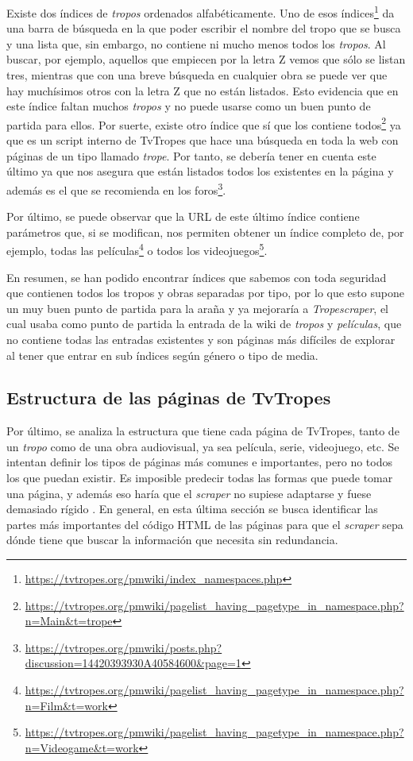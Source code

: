 Existe dos índices de \textit{tropos} ordenados alfabéticamente. Uno de esos
índices\footnote{\url{https://tvtropes.org/pmwiki/index_namespaces.php}} da una
barra de búsqueda en la que poder escribir el nombre del tropo que se busca y
una lista que, sin embargo, no contiene ni mucho menos todos los
\textit{tropos}. Al buscar, por ejemplo, aquellos que empiecen por la letra Z
vemos que sólo se listan tres, mientras que con una breve búsqueda en cualquier
obra se puede ver que hay muchísimos otros con la letra Z que no están listados.
Esto evidencia que en este índice faltan muchos \textit{tropos} y no puede
usarse como un buen punto de partida para ellos. Por suerte, existe otro índice
que sí que los contiene
todos\footnote{\url{https://tvtropes.org/pmwiki/pagelist_having_pagetype_in_namespace.php?n=Main&t=trope}}
ya que es un script interno de TvTropes que hace una búsqueda en toda la web con
páginas de un tipo llamado \textit{trope}. Por tanto, se debería tener en cuenta
este último ya que nos asegura que están listados todos los existentes en la
página y además es el que se recomienda en los
foros\footnote{\url{https://tvtropes.org/pmwiki/posts.php?discussion=14420393930A40584600&page=1}}.

Por último, se puede observar que la URL de este último índice contiene
parámetros que, si se modifican, nos permiten obtener un índice completo de, por
ejemplo, todas las
películas\footnote{\url{https://tvtropes.org/pmwiki/pagelist_having_pagetype_in_namespace.php?n=Film&t=work}}
o todos los
videojuegos\footnote{\url{https://tvtropes.org/pmwiki/pagelist_having_pagetype_in_namespace.php?n=Videogame&t=work}}.

En resumen, se han podido encontrar índices que sabemos con toda seguridad que
contienen todos los tropos y obras separadas por tipo, por lo que esto supone un
muy buen punto de partida para la araña y ya mejoraría a \textit{Tropescraper},
el cual usaba como punto de partida la entrada de la wiki de \textit{tropos} y
\textit{películas}, que no contiene todas las entradas existentes y son páginas
más difíciles de explorar al tener que entrar en sub índices según género o tipo
de media.

\subsection{Estructura de las páginas de TvTropes}
Por último, se analiza la estructura que tiene cada página de TvTropes, tanto de
un \textit{tropo} como de una obra audiovisual, ya sea película, serie,
videojuego, etc. Se intentan definir los tipos de páginas más comunes e
importantes, pero no todos los que puedan existir. Es imposible predecir todas
las formas que puede tomar una página, y además eso haría que el
\textit{scraper} no supiese adaptarse y fuese demasiado rígido
\cite{nishalscraping}. En general, en esta última sección se busca identificar
las partes más importantes del código HTML de las páginas para que el
\textit{scraper} sepa dónde tiene que buscar la información que necesita sin
redundancia.

